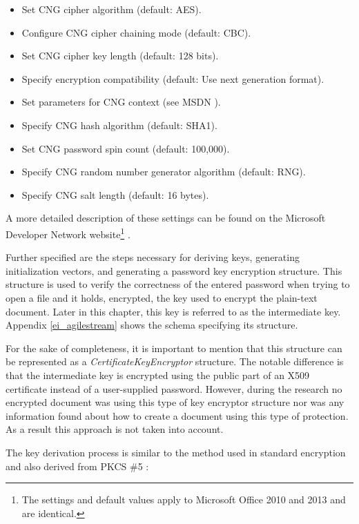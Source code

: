 \documentclass[11pt,oneside]{fithesis2}
\begin{document}
\begin{itemize}
\setlength\itemsep{0.1em}
	\item{Set CNG cipher algorithm (default: AES).}
	\item{Configure CNG cipher chaining mode (default: CBC).}
	\item{Set CNG cipher key length (default: 128 bits).}
	\item{Specify encryption compatibility (default: Use next generation format).}
	\item{Set parameters for CNG context (see MSDN \cite{cng_functions}).}	
	\item{Specify CNG hash algorithm (default: SHA1).}
	\item{Set CNG password spin count (default: 100,000).}
	\item{Specify CNG random number generator algorithm (default: RNG).}
	\item{Specify CNG salt length (default: 16 bytes).}
\end{itemize}

A more detailed description of these settings can be found on the Microsoft Developer Network website\footnote{The settings and default values apply to Microsoft Office 2010 and 2013 and are identical.} \cite{plan_office_crypto}. 

Further specified are the steps necessary for deriving keys, generating initialization vectors, and generating a password key encryption structure. This structure is used to verify the correctness of the entered password when trying to open a file and it holds, encrypted, the key used to encrypt the plain-text document. Later in this chapter, this key is referred to as the intermediate key. Appendix \ref{ei_agilestream} shows the schema specifying its structure.

For the sake of completeness, it is important to mention that this structure can be represented as a \textit{CertificateKeyEncryptor} structure. The notable difference is that the intermediate key is encrypted using the public part of an X509 certificate instead of a user-supplied password. However, during the research no encrypted document was using this type of key encryptor structure nor was any information found about how to create a document using this type of protection. As a result this approach is not taken into account. 

The key derivation process is similar to the method used in standard encryption and also derived from PKCS \#5 \cite{rfc2898}:
\end{document}
